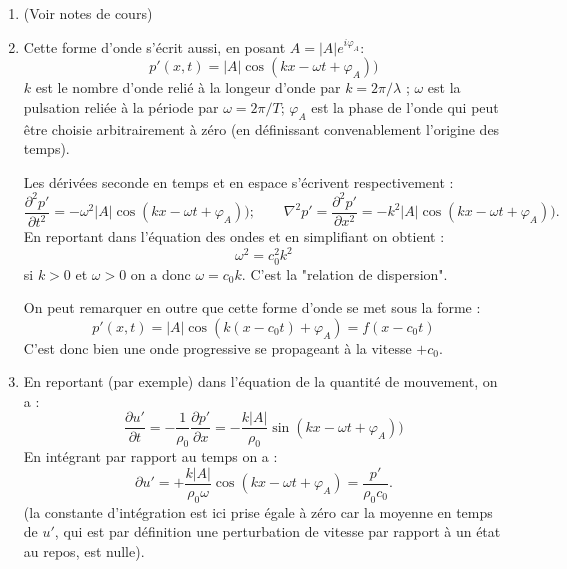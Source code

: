 \documentclass[10pt, a4paper]{article}
\newcommand{\question}[1]{}
\newcommand{\answer}[1]{#1}
\begin{document}
 
\begin{enumerate}
\item 
\question{Rappelez les hypothèses de l'acoustique linéaire. Montrez que sous ces hypothèses, l'évolution de la pression est gouvernée par l'équation de Helmholtz :
$$
\frac{\partial^2 p'}{\partial t^2} = c_0^2 \nabla^2 p'
$$
Définir $c_0$ dans le cas général, puis dans le cas d'un gaz parfait.
}
\answer{(Voir notes de cours)}

\item \question{
On considère une solution d'onde plane progressive monochromatique se déplaçant dans la direction $+\vec{e}_x$, sous la  forme suivante :
$$
p'(x,t) = Re (A e^{i (k x - \omega t)})
$$
Représentez la forme d'une telle onde à différents instants. 

A quoi correspondent les quantités $A$, $k$ et $\omega$ ? Quelle relation relie ces deux dernières quantités ?}
\answer{
Cette forme d'onde s'écrit aussi, en posant $A= |A| e^{i \varphi_A}$:
$$
p'(x,t) =|A| \cos (k x - \omega t+ \varphi_A)) 
$$
$k$ est le nombre d'onde relié à la longeur d'onde par $k = 2\pi/\lambda$ ; $\omega$ est la pulsation reliée à la période par $\omega = 2\pi/T$;
$\varphi_A$ est la phase de l'onde qui peut être choisie arbitrairement à zéro (en définissant convenablement l'origine des temps). 

Les dérivées seconde en temps et en espace s'écrivent respectivement : 
$$
\frac{\partial^2 p'}{\partial t^2} =- \omega^2 |A| \cos (k x - \omega t+ \varphi_A))   ; 
\qquad  \nabla^2 p' =  \frac{\partial^2 p'}{\partial x^2} =-k^2 |A| \cos (k x - \omega t+ \varphi_A)).
$$
En reportant dans l'équation des ondes et en simplifiant on obtient :
$$
\omega^2 = c_0^2 k^2
$$ 
si $k>0$ et $\omega>0$ on a donc $\omega = c_0 k$. C'est la "relation de dispersion".

On peut remarquer en outre que cette forme d'onde se met sous la forme :
$$p'(x,t) =|A| \cos (k (x -c_0 t) + \varphi_A) = f(x-c_0 t)$$
C'est donc bien une onde progressive se propageant à la vitesse $+c_0$.
}


\item 
\question{A partir des équations du mouvement, donnez la loi de vitesse $u'(x,t)$ correspondant à une telle onde.}
\answer{
En reportant (par exemple) dans l'équation de la quantité de mouvement, on a :
$$
\frac{\partial u'}{\partial t} =- \frac{1}{\rho_0} \frac{\partial p'}{\partial x} = - \frac{k |A|}{\rho_0} \sin (k x - \omega t+ \varphi_A)) 
$$ 
En intégrant par rapport au temps on a :
$$
\partial u'  = + \frac{k |A|}{\rho_0 \omega } \cos (k x - \omega t+ \varphi_A) = \frac{p'}{\rho_0 c_0}.
$$ 
(la constante d'intégration est ici prise égale à zéro car la moyenne en temps de $u'$, qui est par définition une perturbation de vitesse par rapport à un état au repos, est nulle).

}
\end{enumerate}
\end{document}
